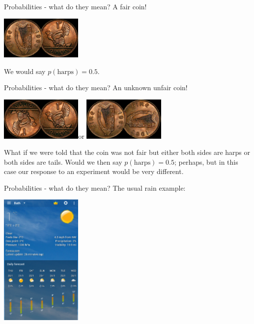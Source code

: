\documentclass{beamer}
\newcommand{\cor}{\color{reddish}{}}
\newcommand{\cob}{\color{black}{}}
\begin{document}
\begin{frame}{Probabilities - what do they mean?}
A fair coin!
  \begin{center}
    \includegraphics[width=4cm]{coin.jpg}
  \end{center}
We would say \cor{}$p(\mbox{harps})=0.5$\cob.
\end{frame}



\begin{frame}{Probabilities - what do they mean?}
An unknown unfair coin!
  \begin{center}
    \includegraphics[width=4cm]{coin_2tail.png}\qquad or \qquad\includegraphics[width=4cm]{coin_2harp.png}
  \end{center}
What if we were told
that the coin was not fair but either both sides are harps or both
sides are tails. Would we then say \cor{}$p(\mbox{harps})=0.5$\cob;
perhaps, but in this case our response to an experiment would be very
different.
\end{frame}



\begin{frame}{Probabilities - what do they mean?}
The usual rain example:
  \begin{center}
    \includegraphics[width=4cm]{rain1.png}
\end{center}
\end{frame}
\end{document}
